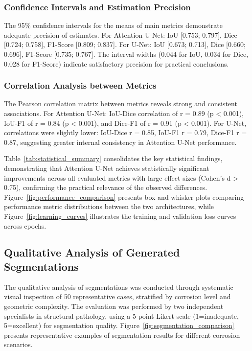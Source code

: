\documentclass[Journal,letterpaper]{ascelike-new}
\begin{document}
\subsubsection{Confidence Intervals and Estimation Precision}

The 95\% confidence intervals for the means of main metrics demonstrate adequate precision of estimates. For Attention U-Net: IoU [0.753; 0.797], Dice [0.724; 0.758], F1-Score [0.809; 0.837]. For U-Net: IoU [0.673; 0.713], Dice [0.660; 0.696], F1-Score [0.735; 0.767]. The interval widths (0.044 for IoU, 0.034 for Dice, 0.028 for F1-Score) indicate satisfactory precision for practical conclusions.

\subsubsection{Correlation Analysis between Metrics}

The Pearson correlation matrix between metrics reveals strong and consistent associations. For Attention U-Net: IoU-Dice correlation of r = 0.89 (p < 0.001), IoU-F1 of r = 0.84 (p < 0.001), and Dice-F1 of r = 0.91 (p < 0.001). For U-Net, correlations were slightly lower: IoU-Dice r = 0.85, IoU-F1 r = 0.79, Dice-F1 r = 0.87, suggesting greater internal consistency in Attention U-Net performance.

Table~\ref{tab:statistical_summary} consolidates the key statistical findings, demonstrating that Attention U-Net achieves statistically significant improvements across all evaluated metrics with large effect sizes (Cohen's d > 0.75), confirming the practical relevance of the observed differences. Figure~\ref{fig:performance_comparison} presents box-and-whisker plots comparing performance metric distributions between the two architectures, while Figure~\ref{fig:learning_curves} illustrates the training and validation loss curves across epochs.

\subsection{Qualitative Analysis of Generated Segmentations}
\label{subsec:qualitative_analysis}

The qualitative analysis of segmentations was conducted through systematic visual inspection of 50 representative cases, stratified by corrosion level and geometric complexity. The evaluation was performed by two independent specialists in structural pathology, using a 5-point Likert scale (1=inadequate, 5=excellent) for segmentation quality. Figure~\ref{fig:segmentation_comparison} presents representative examples of segmentation results for different corrosion scenarios.
\end{document}

